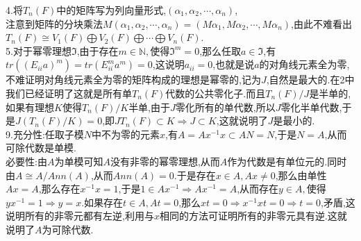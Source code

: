 \documentclass[b5paper,twoside]{ctexart}
\begin{document}
4.将$T_n(F)$中的矩阵写为列向量形式,$(\alpha_1,\alpha_2,\cdots,\alpha_n)$,\\
注意到矩阵的分块乘法$M(\alpha_1,\alpha_2,\cdots,\alpha_n)=(M\alpha_1,M\alpha_2,\cdots,M\alpha_n)$,由此不难看出$T_n(F)\cong V_1(F)\bigoplus V_2(F)\bigoplus \cdots \bigoplus V_n(F)$.\\
5.对于幂零理想$\mathfrak{I}$,由于存在$m\in \mathbb{N},$使得$\mathfrak{I}^m=0$,那么任取$a\in \mathfrak{I}$,有$tr((E_{ii}a)^m)=tr(E_{ii}^ma^m)=0$,这说明$a_{ii}=0$,也就是说$a$的对角线元素全为零,不难证明对角线元素全为零的矩阵构成的理想是幂零的,记为$J$,自然是最大的.在2中我们已经证明了这就是所有单$T_n(F)$代数的公共零化子.而且$T_n(F)/J$是半单的,如果有理想$K$使得$T_n(F)/K$半单,由于$J$零化所有的单代数,所以$J$零化半单代数,于是$J(T_n(F)/K)=0$,即$JT_n(F)\subset K\Rightarrow J\subset K$,这就说明了$J$是最小的.\\
9.充分性:任取子模$N$中不为零的元素$x$,有$A=Ax^{-1}x\subset AN=N$,于是$N=A$,从而可除代数是单模.\\
必要性:由$A$为单模可知$A$没有非零的幂零理想,从而$A$作为代数是有单位元的.同时由$A\cong A/Ann(A)$,从而$Ann(A)=0$.于是存在$x\in A,Ax\neq 0$,那么由单性$Ax=A$,那么存在$x^{-1}x=1$,于是$1\in Ax^{-1}\Rightarrow Ax^{-1}=A$,从而存在$y\in A,$使得$yx^{-1}=1\Rightarrow y=x$.如果存在$t\in A,At=0$,那么$xt=0\Rightarrow x^{-1}xt=0\Rightarrow t=0$,矛盾,这说明所有的非零元都有左逆,利用与$x$相同的方法可证明所有的非零元具有逆.这就说明了$A$为可除代数.
\end{document}
